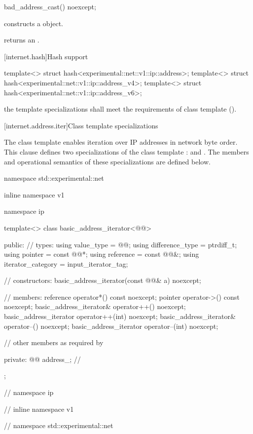 \begin{itemdecl}
bad_address_cast() noexcept;
\end{itemdecl}

\begin{itemdescr}
\pnum
\effects constructs a  object.

\pnum
\postconditions {} returns an  \ntbs.
\end{itemdescr}



[internet.hash]{Hash support}

\begin{itemdecl}
template<> struct hash<experimental::net::v1::ip::address>;
template<> struct hash<experimental::net::v1::ip::address_v4>;
template<> struct hash<experimental::net::v1::ip::address_v6>;
\end{itemdecl}

\begin{itemdescr}
\pnum
\requires the template specializations shall meet the requirements of class template  ().
\end{itemdescr}



%
[internet.address.iter]{Class template  specializations}

\pnum
The class template  enables iteration over IP addresses in network byte order. This clause defines two specializations of the class template :  and . The members and operational semantics of these specializations are defined below.

\begin{codeblock}
namespace std::experimental::net {
inline namespace v1 {
namespace ip {

  template<> class basic_address_iterator<@@>
  {
  public:
    // types:
    using value_type = @@;
    using difference_type = ptrdiff_t;
    using pointer = const @@*;
    using reference = const @@&;
    using iterator_category = input_iterator_tag;

    // constructors:
    basic_address_iterator(const @@& a) noexcept;

    // members:
    reference operator*() const noexcept;
    pointer operator->() const noexcept;
    basic_address_iterator& operator++() noexcept;
    basic_address_iterator operator++(int) noexcept;
    basic_address_iterator& operator--() noexcept;
    basic_address_iterator operator--(int) noexcept;

    // other members as required by 

  private:
    @@ address_; // \expos
  };

} // namespace ip
} // inline namespace v1
} // namespace std::experimental::net
\end{codeblock}

